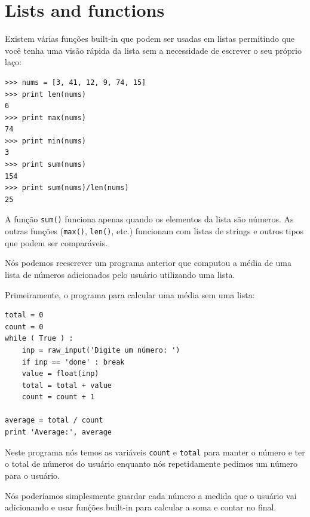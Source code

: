 \section{Lists and functions}

Existem várias funções built-in que podem ser usadas em listas
permitindo que você tenha uma visão rápida da lista sem a necessidade de escrever 
o seu próprio laço:

\beforeverb
\begin{verbatim}
>>> nums = [3, 41, 12, 9, 74, 15]
>>> print len(nums)
6
>>> print max(nums)
74
>>> print min(nums)
3
>>> print sum(nums)
154
>>> print sum(nums)/len(nums)
25
\end{verbatim}
\afterverb
%
A função {\tt sum()} funciona apenas quando os elementos da lista são números.
As outras funções ({\tt max()}, {\tt len()}, etc.) funcionam com listas de strings
e outros tipos que podem ser comparáveis.

Nós podemos reescrever um programa anterior que computou a média de uma lista de 
números adicionados pelo usuário utilizando uma lista.

Primeiramente, o programa para calcular uma média sem uma lista:




\beforeverb
\begin{verbatim}
total = 0
count = 0
while ( True ) :
    inp = raw_input('Digite um número: ')
    if inp == 'done' : break
    value = float(inp)
    total = total + value
    count = count + 1

average = total / count
print 'Average:', average
\end{verbatim}
\afterverb
%
Neste programa nós temos as variáveis {\tt count} e {\tt total} para manter
o número e ter o total de números do usuário enquanto nós repetidamente
pedimos um número para o usuário.

Nós poderíamos simplesmente guardar cada número a medida que o usuário vai 
adicionando e usar funḉões built-in para calcular a soma e contar no final.

